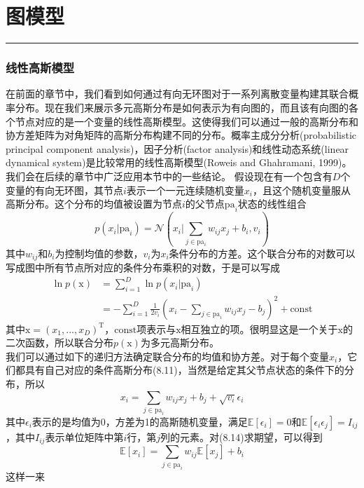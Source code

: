 \documentclass[10pt, b5paper]{book}
\renewcommand {\thetable} {\thechapter{}.\arabic{table}}
\renewcommand {\thefigure} {\thechapter{}.\arabic{figure}}
\numberwithin{equation}{chapter}
\newcommand {\bx} {\boldsymbol{\mathrm{x}}}
\newcommand {\rmT} {\mathrm{T}}
\newcommand {\calN} {\mathcal{N}}
\begin{document}
	\chapter{图模型}
	\noindent\rule[0.25\baselineskip]{\textwidth}{1pt}
	\renewcommand {\thetable} {\thechapter{}.\arabic{table}}
	\renewcommand {\thefigure} {\thechapter{}.\arabic{figure}}

	\subsection{线性高斯模型}
	\textnormal{
	在前面的章节中，我们看到如何通过有向无环图对于一系列离散变量构建其联合概率分布。现在我们来展示多元高斯分布是如何表示为有向图的，而且该有向图的各个节点对应的是一个变量的线性高斯模型。这使得我们可以通过一般的高斯分布和协方差矩阵为对角矩阵的高斯分布构建不同的分布。概率主成分分析(probabilistic principal component analysis)，因子分析(factor analysis)和线性动态系统(linear dynamical system)是比较常用的线性高斯模型(Roweis and Ghahramani, 1999)。我们会在后续的章节中广泛应用本节中的一些结论。
	\indent 假设现在有一个包含有$D$个变量的有向无环图，其节点$i$表示一个一元连续随机变量$x_i$，且这个随机变量服从高斯分布。这个分布的均值被设置为节点$i$的父节点$\mathrm{pa}_i$状态的线性组合
	\begin{equation}
		p(x_i|\mathrm{pa}_i) = \calN\left(x_i | \sum_{j \in \mathrm{pa}_i}w_{ij}x_j + b_i, v_i\right)
	\end{equation}
	其中$w_{ij}$和$b_i$为控制均值的参数，$v_i$为$x_i$条件分布的方差。这个联合分布的对数可以写成图中所有节点所对应的条件分布乘积的对数，于是可以写成
	\begin{align}
		\ln p(\bx) &= \sum_{i=1}^D \ln p(x_i|\mathrm{pa}_i) \\
		&= -\sum_{i=1}^D \frac{1}{2v_i}\left(x_i - \sum_{j \in \mathrm{pa}_i} w_{ij}x_j - b_j\right)^2 + \mathrm{const}
	\end{align}
	其中$\bx = (x_1,...,x_D)^{\rmT}$，$\mathrm{const}$项表示与$\bx$相互独立的项。很明显这是一个关于$\bx$的二次函数，所以联合分布$p(\bx)$为多元高斯分布。\\
	\indent 我们可以通过如下的递归方法确定联合分布的均值和协方差。对于每个变量$x_i$，它们都具有自己对应的条件高斯分布(8.11)，当然是给定其父节点状态的条件下的分布，所以
	\begin{equation}
		x_i = \sum_{j \in \mathrm{pa}_i} w_{ij}x_j + b_j + \sqrt{v_i} \epsilon_i
	\end{equation}
	其中$\epsilon_i$表示的是均值为0，方差为1的高斯随机变量，满足$\mathbb{E}[\epsilon_i] = 0$和$\mathbb{E}[\epsilon_i\epsilon_j] = I_{ij}$，其中$I_{ij}$表示单位矩阵中第$i$行，第$j$列的元素。对(8.14)求期望，可以得到
	\begin{equation}
		\mathbb{E}[x_i] = \sum_{j \in \mathrm{pa}_i} w_{ij} \mathbb{E}[x_j] + b_i
	\end{equation}
	这样一来
	}
\end{document}
